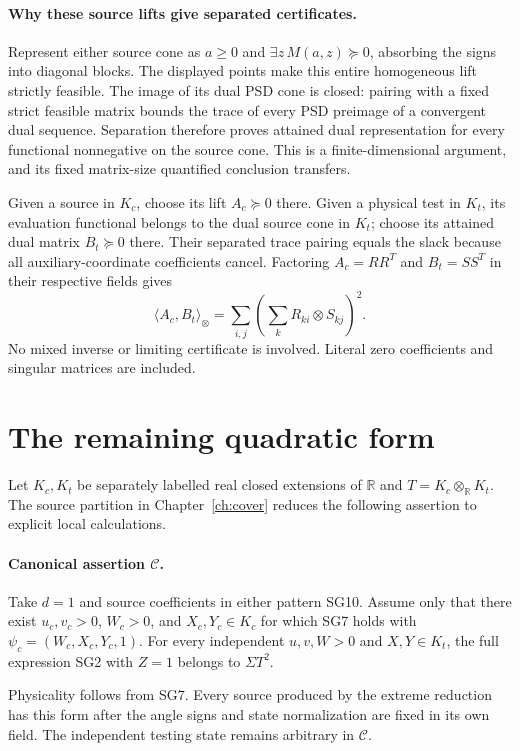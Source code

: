 \paragraph{Why these source lifts give separated certificates.}
Represent either source cone as $a\geq0$ and
$\exists z\,M(a,z)\succeq0$, absorbing the signs into diagonal
blocks.  The displayed points make this entire homogeneous lift
strictly feasible.  The image of its dual PSD cone is closed:
pairing with a fixed strict feasible matrix bounds the trace of
every PSD preimage of a convergent dual sequence.  Separation
therefore proves attained dual representation for every functional
nonnegative on the source cone.  This is a finite-dimensional
argument, and its fixed matrix-size quantified conclusion transfers.

Given a source in $K_c$, choose its lift $A_c\succeq0$ there.
Given a physical test in $K_t$, its evaluation functional belongs
to the dual source cone in $K_t$; choose its attained dual matrix
$B_t\succeq0$ there.  Their separated trace pairing equals the
slack because all auxiliary-coordinate coefficients cancel.
Factoring $A_c=RR^T$ and $B_t=SS^T$ in their respective fields gives
\[
 \langle A_c,B_t\rangle_{\otimes}
       =\sum_{i,j}\left(\sum_k R_{ki}\otimes S_{kj}\right)^2.
                                                               \tag{SG14}
\]
No mixed inverse or limiting certificate is involved.  Literal
zero coefficients and singular matrices are included.

\section{The remaining quadratic form}

Let $K_c,K_t$ be separately labelled real closed extensions of
$\mathbb R$ and $T=K_c\otimes_{\mathbb R}K_t$.
The source partition in Chapter~\ref{ch:cover} reduces the following
assertion to explicit local calculations.

\paragraph{Canonical assertion $\mathcal C$.}
Take $d=1$ and source coefficients in either pattern SG10.
Assume only that there exist $u_c,v_c>0$, $W_c>0$, and
$X_c,Y_c\in K_c$ for which SG7 holds with
$\psi_c=(W_c,X_c,Y_c,1)$.  For every independent
$u,v,W>0$ and $X,Y\in K_t$, the full expression SG2 with
$Z=1$ belongs to $\Sigma T^2$.

Physicality follows from SG7. Every source produced by the extreme
reduction has this form after the angle signs and state normalization
are fixed in its own field. The independent testing state remains
arbitrary in $\mathcal C$.

